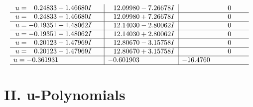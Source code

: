 \documentclass[1p]{elsarticle_modified}
\theoremstyle{definition}
\begin{document}
$$\begin{array}{c|c|c}
\begin{aligned}
u &= \phantom{-}0.24833 + 1.46680 I\end{aligned}
 & \phantom{-}12.09980 - 7.26678 I & \phantom{-0.000000 } 0 \\ \hline\begin{aligned}
u &= \phantom{-}0.24833 - 1.46680 I\end{aligned}
 & \phantom{-}12.09980 + 7.26678 I & \phantom{-0.000000 } 0 \\ \hline\begin{aligned}
u &= -0.19351 + 1.48062 I\end{aligned}
 & \phantom{-}12.14030 - 2.80062 I & \phantom{-0.000000 } 0 \\ \hline\begin{aligned}
u &= -0.19351 - 1.48062 I\end{aligned}
 & \phantom{-}12.14030 + 2.80062 I & \phantom{-0.000000 } 0 \\ \hline\begin{aligned}
u &= \phantom{-}0.20123 + 1.47969 I\end{aligned}
 & \phantom{-}12.80670 - 3.15758 I & \phantom{-0.000000 } 0 \\ \hline\begin{aligned}
u &= \phantom{-}0.20123 - 1.47969 I\end{aligned}
 & \phantom{-}12.80670 + 3.15758 I & \phantom{-0.000000 } 0 \\ \hline\begin{aligned}
u &= -0.361931\phantom{ +0.000000I}\end{aligned}
 & -0.601903\phantom{ +0.000000I} & -16.4760\phantom{ +0.000000I}\\
 \hline 
 \end{array}$$\newpage
\newpage\renewcommand{\arraystretch}{1}
\centering \section*{ II. u-Polynomials}
\end{document}
